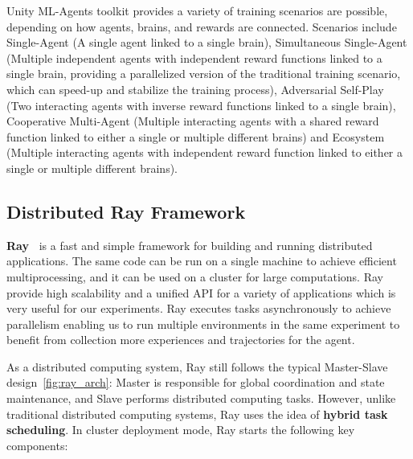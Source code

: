 Unity ML-Agents toolkit provides a variety of training scenarios are possible, depending on how agents, brains, and rewards are connected. Scenarios include Single-Agent (A single agent linked to a single brain), Simultaneous Single-Agent (Multiple independent agents with independent reward functions linked to a single brain, providing a parallelized version of the traditional training scenario, which can speed-up and stabilize the training process), Adversarial Self-Play (Two interacting agents with inverse reward functions linked to a single brain), Cooperative Multi-Agent (Multiple interacting agents with a shared reward function linked to either a single or multiple different brains) and Ecosystem (Multiple interacting agents with independent reward function linked to either a single or multiple different brains).

\subsection{Distributed Ray Framework}

\textbf{Ray~\parencite{moritz2018ray}} is a fast and simple framework for building and running distributed applications. The same code can be run on a single machine to achieve efficient multiprocessing, and it can be used on a cluster for large computations. Ray provide high scalability and a unified API for a variety of applications which is very useful for our experiments. Ray executes tasks asynchronously to achieve parallelism enabling us to run multiple environments in the same experiment to benefit from collection more experiences and trajectories for the agent.

As a distributed computing system, Ray still follows the typical Master-Slave design~\ref{fig:ray_arch}: Master is responsible for global coordination and state maintenance, and Slave performs distributed computing tasks. However, unlike traditional distributed computing systems, Ray uses the idea of \textbf{hybrid task scheduling}. In cluster deployment mode, Ray starts the following key components:

